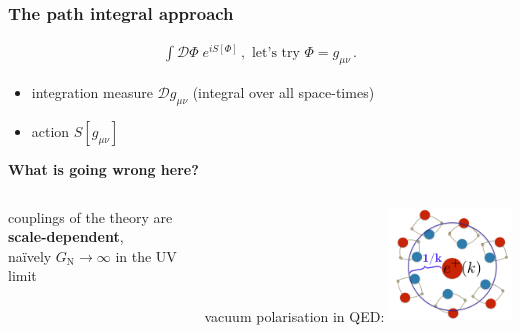 \documentclass[]{beamer}  %
\newcommand\GNewton{ G_{\scriptscriptstyle{\mathrm{N}}}{} }
\newcommand\metric{ g_{\mu\nu} }
\begin{document}
\addtocounter{framenumber}{-1}
\begin{frame}
  \frametitle{The path integral approach}
  \begin{align*}
    \boxed{
    \int \mathcal D \Phi \; e^{i S[\Phi]}\,,
    \text{ let's try } \Phi = \metric \,.
    }
  \end{align*}
  \vfill
  \begin{itemize}
    \item integration measure $\mathcal D \metric$ (integral over all space-times)
    \item action $S[\metric]$
  \end{itemize}
  \vfill
  \begin{center}
    \fontsize{12pt}{7.2}\selectfont
    \textbf{ What is going wrong here? }
  \end{center}
  \begin{columns}[T]
    \begin{column}{.5\textwidth}
      \begin{center}
        couplings of the theory are \textbf{scale-dependent},\\[10pt]
        na\"ively $\GNewton \rightarrow \infty$ in the UV limit
      \end{center}
    \end{column}
    \begin{column}{.5\textwidth}
      \begin{center}
        vacuum polarisation in QED:
        \includegraphics[width=0.4\textwidth]{screening.png}
      \end{center}
    \end{column}
  \end{columns}
\end{frame}


\end{document}
